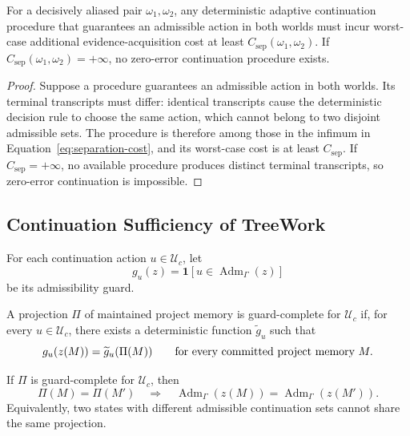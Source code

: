 \begin{theorem}
\label{thm:error-or-cost}
For a decisively aliased pair $\omega_1,\omega_2$, any deterministic adaptive
continuation procedure that guarantees an admissible action in both worlds must
incur worst-case additional evidence-acquisition cost at least
$C_{\mathrm{sep}}(\omega_1,\omega_2)$.  If
$C_{\mathrm{sep}}(\omega_1,\omega_2)=+\infty$, no zero-error continuation
procedure exists.
\end{theorem}

\begin{proof}
Suppose a procedure guarantees an admissible action in both worlds.  Its
terminal transcripts must differ: identical transcripts cause the deterministic
decision rule to choose the same action, which cannot belong to two disjoint
admissible sets.  The procedure is therefore among those in the infimum in
Equation~\eqref{eq:separation-cost}, and its worst-case cost is at least
$C_{\mathrm{sep}}$.  If $C_{\mathrm{sep}}=+\infty$, no available procedure
produces distinct terminal transcripts, so zero-error continuation is
impossible.
\end{proof}

\subsection{Continuation Sufficiency of TreeWork}

For each continuation action $u\in\mathcal U_c$, let
\begin{equation}
g_u(z)
=
\mathbf 1
\left[
u\in\operatorname{Adm}_\Gamma(z)
\right]
\end{equation}
be its admissibility guard.

\begin{definition}
A projection $\Pi$ of maintained project memory is guard-complete for
$\mathcal U_c$ if, for every $u\in\mathcal U_c$, there exists a deterministic
function $\widetilde g_u$ such that
\begin{equation}
g_u(z(M))
=
\widetilde g_u(\Pi(M))
\qquad
\textnormal{for every committed project memory }M.
\label{eq:guard-factorization}
\end{equation}
\end{definition}

\begin{lemma}
\label{thm:continuation-sufficiency}
If $\Pi$ is guard-complete for $\mathcal U_c$, then
\begin{equation}
\Pi(M)=\Pi(M')
\quad\Longrightarrow\quad
\operatorname{Adm}_\Gamma(z(M))
=
\operatorname{Adm}_\Gamma(z(M')).
\label{eq:sufficient-projection}
\end{equation}
Equivalently, two states with different admissible continuation sets cannot
share the same projection.
\end{lemma}

